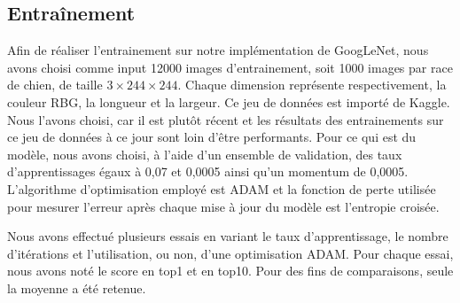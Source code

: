 \documentclass{article}
\begin{document}
\subsection{Entraînement}
Afin de réaliser l’entrainement sur notre implémentation de GoogLeNet, nous
avons choisi comme input 12000 images d’entrainement, soit 1000 images par race
de chien, de taille $3\times 244 \times 244$. Chaque dimension représente
respectivement, la couleur RBG, la longueur et la largeur. Ce jeu de données est
importé de Kaggle. Nous l’avons choisi, car il est plutôt récent et les
résultats des entrainements sur ce jeu de données à ce jour sont loin d’être
performants. Pour ce qui est du modèle, nous avons choisi, à l’aide d’un
ensemble de validation, des taux d’apprentissages égaux à 0,07 et 0,0005 ainsi
qu'un momentum de 0,0005. L’algorithme d’optimisation employé est ADAM et la
fonction de perte utilisée pour mesurer l’erreur après chaque mise à jour du
modèle est l'entropie croisée.

Nous avons effectué plusieurs essais en variant le taux d'apprentissage, le
nombre d'itérations et l'utilisation, ou non, d'une optimisation ADAM. Pour
chaque essai, nous avons noté le score en top1 et en top10. Pour des fins de
comparaisons, seule la moyenne a été retenue.
\end{document}
